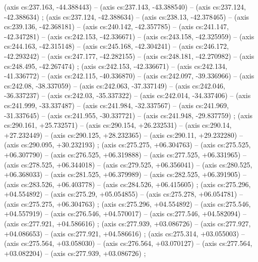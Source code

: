     (axis cs:237.163,    -44.388443) --  (axis cs:237.143,    -43.388540) --  (axis cs:237.124,    -42.388634) ;
    (axis cs:237.124,    -42.388634) --  (axis cs:238.13,    -42.378465) --  (axis cs:239.136,    -42.368181) --  (axis cs:240.142,    -42.357785) --  (axis cs:241.147,    -42.347281) --  (axis cs:242.153,    -42.336671) --  (axis cs:243.158,    -42.325959) --  (axis cs:244.163,    -42.315148) --  (axis cs:245.168,    -42.304241) --  (axis cs:246.172,    -42.293242) --  (axis cs:247.177,    -42.282155) --  (axis cs:248.181,    -42.270982) --  (axis cs:248.495,    -42.267474) ;
    (axis cs:242.153,    -42.336671) --  (axis cs:242.134,    -41.336772) --  (axis cs:242.115,    -40.336870) --  (axis cs:242.097,    -39.336966) --  (axis cs:242.08,    -38.337059) --  (axis cs:242.063,    -37.337149) --  (axis cs:242.046,    -36.337237) --  (axis cs:242.03,    -35.337322) --  (axis cs:242.014,    -34.337406) --  (axis cs:241.999,    -33.337487) --  (axis cs:241.984,    -32.337567) --  (axis cs:241.969,    -31.337645) --  (axis cs:241.955,    -30.337721) --  (axis cs:241.948,    -29.837759) ;
    (axis cs:290.161,    +25.732571) --  (axis cs:290.154,    +26.232531) --  (axis cs:290.14,    +27.232449) --  (axis cs:290.125,    +28.232365) --  (axis cs:290.11,    +29.232280) --  (axis cs:290.095,    +30.232193) ;
    (axis cs:275.275,    +06.304763) --  (axis cs:275.525,    +06.307790) --  (axis cs:276.525,    +06.319888) --  (axis cs:277.525,    +06.331965) --  (axis cs:278.525,    +06.344018) --  (axis cs:279.525,    +06.356041) --  (axis cs:280.525,    +06.368033) --  (axis cs:281.525,    +06.379989) --  (axis cs:282.525,    +06.391905) --  (axis cs:283.526,    +06.403778) --  (axis cs:284.526,    +06.415605) ;
    (axis cs:275.296,    +04.554892) --  (axis cs:275.29,    +05.054855) --  (axis cs:275.278,    +06.054781) --  (axis cs:275.275,    +06.304763) ;
    (axis cs:275.296,    +04.554892) --  (axis cs:275.546,    +04.557919) --  (axis cs:276.546,    +04.570017) --  (axis cs:277.546,    +04.582094) --  (axis cs:277.921,    +04.586616) ;
    (axis cs:277.939,    +03.086726) --  (axis cs:277.927,    +04.086653) --  (axis cs:277.921,    +04.586616) ;
    (axis cs:275.314,    +03.055003) --  (axis cs:275.564,    +03.058030) --  (axis cs:276.564,    +03.070127) --  (axis cs:277.564,    +03.082204) --  (axis cs:277.939,    +03.086726) ;
